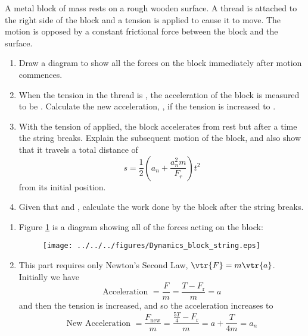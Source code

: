 
\begin{problem}[A1987PSIIQ9a] %
{A metal block of mass  rests on a rough wooden surface. A thread is attached to the right side of the block and a tension is applied to cause it to move. The motion is opposed by a constant frictional force  between the block and the surface.
\begin{enumerate}
	\item Draw a diagram to show all the forces on the block immediately after motion commences.
	\item When the tension in the thread is , the acceleration of the block is measured to be . Calculate the new acceleration, , if the tension is increased to .
	\item With the tension of  applied, the block accelerates from rest but after a time  the string breaks. Explain the subsequent motion of the block, and also show that it travels a total distance of 
	\begin{equation*} 
	s = \frac{1}{2} \left(a_{n} + \frac{a_{n}^{2}m}{F_{r}} \right)t^{2}
	\end{equation*} 
	from its initial position.
	\item Given that    and , calculate the work done by the block after the string breaks.
\end{enumerate}
}
{}
{\begin{enumerate}
	\item Figure \ref{fig:Dynamics_block_string} is a diagram showing all of the forces acting on the block:
\begin{figure}[h]
\centering
\texttt{[image: ../../../figures/Dynamics\_block\_string.eps]}
\caption{}
\label{fig:Dynamics_block_string}
\end{figure}
	\item This part requires only Newton's Second Law, $\vtr{F} = m\vtr{a}$. Initially we have 
	\begin{equation*} 
	\text{Acceleration } = \frac{F}{m} = \frac{T - F_{\text{r}}}{m} = a \end{equation*}
and then the tension is increased, and so the acceleration increases to
	\begin{equation*}
	 \text{New Acceleration } = \frac{F_{\text{new}}}{m} = \frac{\frac{5T}{4} - F_{\text{r}}}{m} = a + \frac{T}{4m} = a_{n} 
	 \end{equation*}
	

\end{enumerate}}
\end{problem}
